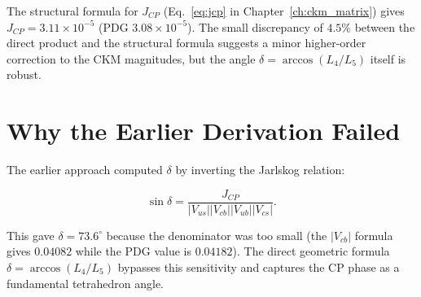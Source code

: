 The structural formula for \(J_{CP}\) (Eq.~\eqref{eq:jcp} in
Chapter~\ref{ch:ckm_matrix}) gives \(J_{CP} = 3.11 \times 10^{-5}\)
(PDG \(3.08 \times 10^{-5}\)).
The small discrepancy of \(4.5\%\) between the direct product and the
structural formula suggests a minor higher-order correction to the
CKM magnitudes, but the angle \(\delta = \arccos(L_4/L_5)\) itself is
robust.

\section{Why the Earlier Derivation Failed}

The earlier approach computed \(\delta\) by inverting the Jarlskog
relation:

\[
\sin\delta = \frac{J_{CP}}{|V_{us}||V_{cb}||V_{ub}||V_{cs}|}.
\]

This gave \(\delta = 73.6^\circ\) because the denominator was too small
(the \(|V_{cb}|\) formula gives \(0.04082\) while the PDG value is
\(0.04182\)).  The direct geometric formula \(\delta = \arccos(L_4/L_5)\)
bypasses this sensitivity and captures the CP phase as a fundamental
tetrahedron angle.
